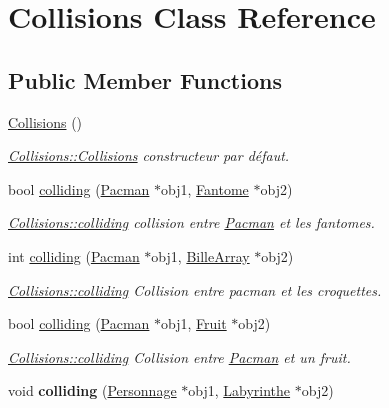 \hypertarget{class_collisions}{}\section{Collisions Class Reference}
\label{class_collisions}
\subsection*{Public Member Functions}
\begin{DoxyCompactItemize}
\item 
\hypertarget{class_collisions_a006630da4b62b10ebf123c6333c2b198}{}\hyperlink{class_collisions_a006630da4b62b10ebf123c6333c2b198}{Collisions} ()\label{class_collisions_a006630da4b62b10ebf123c6333c2b198}

\begin{DoxyCompactList}\small\item\em \hyperlink{class_collisions_a006630da4b62b10ebf123c6333c2b198}{Collisions\+::\+Collisions} constructeur par défaut. \end{DoxyCompactList}\item 
bool \hyperlink{class_collisions_a121f130f16ab50d0c7374028137dd984}{colliding} (\hyperlink{class_pacman}{Pacman} $\ast$obj1, \hyperlink{class_fantome}{Fantome} $\ast$obj2)
\begin{DoxyCompactList}\small\item\em \hyperlink{class_collisions_a121f130f16ab50d0c7374028137dd984}{Collisions\+::colliding} collision entre \hyperlink{class_pacman}{Pacman} et les fantomes. \end{DoxyCompactList}\item 
int \hyperlink{class_collisions_abb2c6a1d9521cf58911f212e2817dfc7}{colliding} (\hyperlink{class_pacman}{Pacman} $\ast$obj1, \hyperlink{class_bille_array}{Bille\+Array} $\ast$obj2)
\begin{DoxyCompactList}\small\item\em \hyperlink{class_collisions_a121f130f16ab50d0c7374028137dd984}{Collisions\+::colliding} Collision entre pacman et les croquettes. \end{DoxyCompactList}\item 
bool \hyperlink{class_collisions_adabbc973e6cb6880f93b338538f05efa}{colliding} (\hyperlink{class_pacman}{Pacman} $\ast$obj1, \hyperlink{class_fruit}{Fruit} $\ast$obj2)
\begin{DoxyCompactList}\small\item\em \hyperlink{class_collisions_a121f130f16ab50d0c7374028137dd984}{Collisions\+::colliding} Collision entre \hyperlink{class_pacman}{Pacman} et un fruit. \end{DoxyCompactList}\item 
\hypertarget{class_collisions_a5c22844d08ebf198357076dbe0d64966}{}void {\bfseries colliding} (\hyperlink{class_personnage}{Personnage} $\ast$obj1, \hyperlink{class_labyrinthe}{Labyrinthe} $\ast$obj2)\label{class_collisions_a5c22844d08ebf198357076dbe0d64966}


\end{DoxyCompactItemize}

